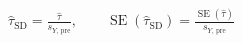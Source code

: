 \documentclass[border=3pt]{standalone}
\begin{document}
$\displaystyle \widehat{\tau}_{\mathrm{SD}}=\frac{\widehat{\tau}}{s_{Y,\,\mathrm{pre}}},\qquad \operatorname{SE}(\widehat{\tau}_{\mathrm{SD}})=\frac{\operatorname{SE}(\widehat{\tau})}{s_{Y,\,\mathrm{pre}}}$
\end{document}
